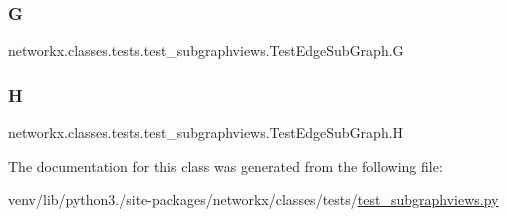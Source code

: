\subsubsection{\texorpdfstring{G}{G}}
{\footnotesize\ttfamily networkx.\+classes.\+tests.\+test\+\_\+subgraphviews.\+Test\+Edge\+Sub\+Graph.\+G}

\mbox{\label{classnetworkx_1_1classes_1_1tests_1_1test__subgraphviews_1_1TestEdgeSubGraph_a07704d6441e79abc097a5f5cc2556117}} 
\subsubsection{\texorpdfstring{H}{H}}
{\footnotesize\ttfamily networkx.\+classes.\+tests.\+test\+\_\+subgraphviews.\+Test\+Edge\+Sub\+Graph.\+H}



The documentation for this class was generated from the following file\+:\begin{DoxyCompactItemize}
\item 
venv/lib/python3./site-\/packages/networkx/classes/tests/\hyperlink{test__subgraphviews_8py}{test\+\_\+subgraphviews.\+py}\end{DoxyCompactItemize}
